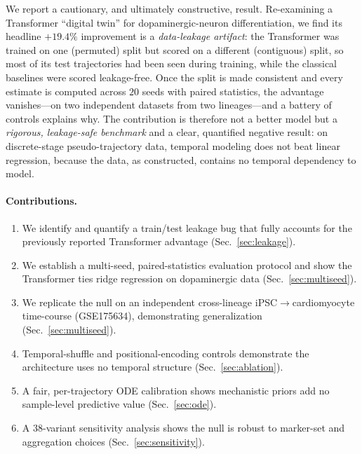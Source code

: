 \documentclass[11pt]{article}
\begin{document}
We report a cautionary, and ultimately constructive, result. Re-examining a
Transformer ``digital twin'' for dopaminergic-neuron differentiation, we find its
headline $+19.4\%$ improvement is a \emph{data-leakage artifact}: the Transformer
was trained on one (permuted) split but scored on a different (contiguous) split,
so most of its test trajectories had been seen during training, while the classical
baselines were scored leakage-free. Once the split is made consistent and every
estimate is computed across $20$ seeds with paired statistics, the advantage
vanishes---on two independent datasets from two lineages---and a battery of controls
explains why. The contribution is therefore not a better model but a
\emph{rigorous, leakage-safe benchmark} and a clear, quantified negative result:
on discrete-stage pseudo-trajectory data, temporal modeling does not beat linear
regression, because the data, as constructed, contains no temporal dependency to
model.

\paragraph{Contributions.}
\begin{enumerate}\itemsep1pt
  \item We identify and quantify a train/test leakage bug that fully accounts for
        the previously reported Transformer advantage (Sec.~\ref{sec:leakage}).
  \item We establish a multi-seed, paired-statistics evaluation protocol and show
        the Transformer ties ridge regression on dopaminergic data
        (Sec.~\ref{sec:multiseed}).
  \item We replicate the null on an independent cross-lineage
        iPSC$\rightarrow$cardiomyocyte time-course (GSE175634), demonstrating
        generalization (Sec.~\ref{sec:multiseed}).
  \item Temporal-shuffle and positional-encoding controls demonstrate the
        architecture uses no temporal structure (Sec.~\ref{sec:ablation}).
  \item A fair, per-trajectory ODE calibration shows mechanistic priors add no
        sample-level predictive value (Sec.~\ref{sec:ode}).
  \item A $38$-variant sensitivity analysis shows the null is robust to marker-set
        and aggregation choices (Sec.~\ref{sec:sensitivity}).
\end{enumerate}
\end{document}
